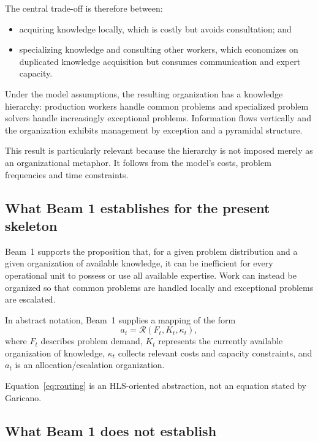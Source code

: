 The central trade-off is therefore between:
\begin{itemize}
\item acquiring knowledge locally, which is costly but avoids consultation; and
\item specializing knowledge and consulting other workers, which economizes on duplicated
knowledge acquisition but consumes communication and expert capacity.
\end{itemize}

Under the model assumptions, the resulting organization has a knowledge hierarchy:
production workers handle common problems and specialized problem solvers handle increasingly
exceptional problems. Information flows vertically and the organization exhibits management
by exception and a pyramidal structure.

This result is particularly relevant because the hierarchy is not imposed merely as an
organizational metaphor. It follows from the model's costs, problem frequencies and time
constraints.

\subsection{What Beam 1 establishes for the present skeleton}

Beam~1 supports the proposition that, for a given problem distribution and a given organization
of available knowledge, it can be inefficient for every operational unit to possess or use
all available expertise. Work can instead be organized so that common problems are handled
locally and exceptional problems are escalated.

In abstract notation, Beam~1 supplies a mapping of the form
\begin{equation}
a_t = \mathcal{R}(F_t,K_t,\kappa_t),
\label{eq:routing}
\end{equation}
where \(F_t\) describes problem demand, \(K_t\) represents the currently available organization
of knowledge, \(\kappa_t\) collects relevant costs and capacity constraints, and \(a_t\) is an
allocation/escalation organization.

Equation~\eqref{eq:routing} is an HLS-oriented abstraction, not an equation stated by
Garicano.

\subsection{What Beam 1 does not establish}

